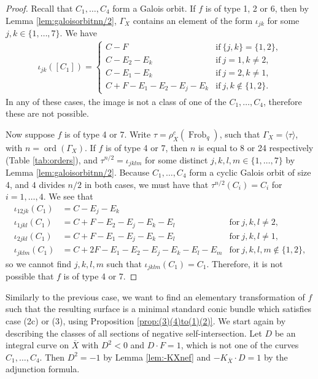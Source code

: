 \documentclass[a4paper, 11pt, reqno]{amsart}
\numberwithin{equation}{section} \numberwithin{figure}{section}
\DeclareMathOperator{\ord}{ord}
\DeclareMathOperator{\Frob}{Frob}
\theoremstyle{definition}
\numberwithin{lemma}{section}
\begin{document}
\begin{proof}
    Recall that $C_1, \ldots, C_4$ form a Galois orbit. If $f$ is of type 1, 2 or 6, then by Lemma \ref{lem:galoisorbitnn/2}, $\Gamma_X$ contains an element of the form $\iota_{jk}$ for some $j, k \in \{1, \ldots, 7\}$. We have 
    \begin{align*}
    \iota_{jk}([C_1]) = \begin{cases}
        C - F &\text{if} \ \{j, k\} = \{1, 2\},\\
        C - E_2 - E_k &\text{if} \ j = 1, k \neq 2,\\
        C - E_1 - E_k &\text{if} \ j = 2, k \neq 1,\\
        C + F - E_1 - E_2 - E_j - E_k &\text{if} \ j, k \notin \{1, 2\}.
    \end{cases}
\end{align*}
In any of these cases, the image is not a class of one of the $C_1, \ldots, C_4$, therefore these are not possible.

Now suppose $f$ is of type 4 or 7. Write $\tau = \rho_X^c(\Frob_q)$, such that $\Gamma_X = \langle \tau \rangle$, with $n = \ord(\Gamma_X)$. If $f$ is of type 4 or 7, then $n$ is equal to 8 or 24 respectively (Table \ref{tab:orders}), and  $\tau^{n/2} = \iota_{jklm}$ for some distinct $j, k, l, m \in \{1, \ldots, 7\}$ by Lemma \ref{lem:galoisorbitnn/2}. Because $C_1, \ldots, C_4$ form a cyclic Galois orbit of size 4, and $4$ divides $n/2$ in both cases, we must have that $\tau^{n/2}(C_i) = C_i$ for $i = 1, \ldots, 4$. We see that 
\begin{align*}
        \iota_{12jk}(C_1) &= C - E_j - E_k\\
        \iota_{1jkl}(C_1) &= C + F - E_2 - E_j - E_k - E_l &\text{for} \ j, k, l \neq 2,\\
        \iota_{2jkl}(C_1) &= C + F - E_1 - E_j - E_k - E_l &\text{for} \ j, k, l \neq 1,\\
        \iota_{jklm}(C_1) &= C + 2F - E_1 - E_2 - E_j - E_k - E_l - E_m&\text{for} \ j, k, l, m \notin\{1, 2\},
    \end{align*}
so we cannot find $j,k,l, m$ such that $\iota_{jklm}(C_1) = C_1$. Therefore, it is not possible that $f$ is of type 4 or 7.
\end{proof}

Similarly to the previous case, we want to find an elementary transformation of $f$ such that the resulting surface is a minimal standard conic bundle which satisfies case (2c) or (3), using Proposition \ref{prop:(3)(4)to(1)(2)}. We start again by describing the classes of all sections of negative self-intersection. Let $D$ be an integral curve on $\overline{X}$ with $D^2 < 0$ and $D \cdot F = 1$, which is not one of the curves $C_1, \ldots, C_4$. Then $D^2 = -1$ by Lemma \ref{lem:-KXnef} and $-K_{\overline{X}} \cdot D = 1$ by the adjunction formula.
\end{document}
